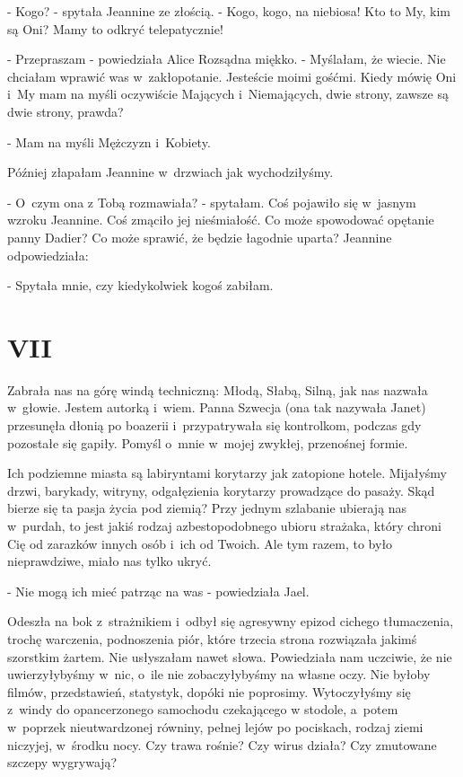 \documentclass[oneside,polish,12pt,sfheadings]{mwbk}
\begin{document}
- Kogo? - spytała Jeannine ze złością. - Kogo, kogo, na niebiosa!
Kto to My, kim są Oni? Mamy to odkryć telepatycznie!

- Przepraszam - powiedziała Alice Rozsądna miękko. - Myślałam, że
wiecie. Nie chciałam wprawić was w~zakłopotanie. Jesteście moimi gośćmi.
Kiedy mówię Oni i~My mam na myśli oczywiście Mających i~Niemających,
dwie strony, zawsze są dwie strony, prawda?

- Mam na myśli Mężczyzn i~Kobiety.

Później złapałam Jeannine w~drzwiach jak wychodziłyśmy. 

- O~czym ona z Tobą rozmawiała? - spytałam. Coś pojawiło się w~jasnym wzroku Jeannine.
Coś zmąciło jej nieśmiałość. Co może spowodować opętanie panny Dadier?
Co może sprawić, że będzie łagodnie uparta? Jeannine odpowiedziała:

- Spytała mnie, czy kiedykolwiek kogoś zabiłam.

\chapter{VII}

Zabrała nas na górę windą techniczną: Młodą, Słabą, Silną, jak nas
nazwała w~głowie. Jestem autorką i~wiem. Panna Szwecja (ona tak nazywała
Janet) przesunęła dłonią po boazerii i~przypatrywała się kontrolkom,
podczas gdy pozostałe się gapiły. Pomyśl o~mnie w~mojej zwykłej, przenośnej
formie.

Ich podziemne miasta są labiryntami korytarzy jak zatopione hotele.
Mijałyśmy drzwi, barykady, witryny, odgałęzienia korytarzy prowadzące
do pasaży. Skąd bierze się ta pasja życia pod ziemią? Przy jednym
szlabanie ubierają nas w~purdah, to jest jakiś rodzaj azbestopodobnego
ubioru strażaka, który chroni Cię od zarazków innych osób i~ich od
Twoich. Ale tym razem, to było nieprawdziwe, miało nas tylko ukryć.

- Nie mogą ich mieć patrząc na was - powiedziała Jael. 

Odeszła na bok z~strażnikiem i~odbył się agresywny epizod cichego tłumaczenia,
trochę warczenia, podnoszenia piór, które trzecia strona rozwiązała
jakimś szorstkim żartem. Nie usłyszałam nawet słowa. Powiedziała nam
uczciwie, że nie uwierzyłybyśmy w~nic, o~ile nie zobaczyłybyśmy na
własne oczy. Nie byłoby filmów, przedstawień, statystyk, dopóki nie
poprosimy. Wytoczyłyśmy się z~windy do opancerzonego samochodu czekającego
w stodole, a~potem w~poprzek nieutwardzonej równiny, pełnej lejów
po pociskach, rodzaj ziemi niczyjej, w~środku nocy. Czy trawa rośnie?
Czy wirus działa? Czy zmutowane szczepy wygrywają?
\end{document}
